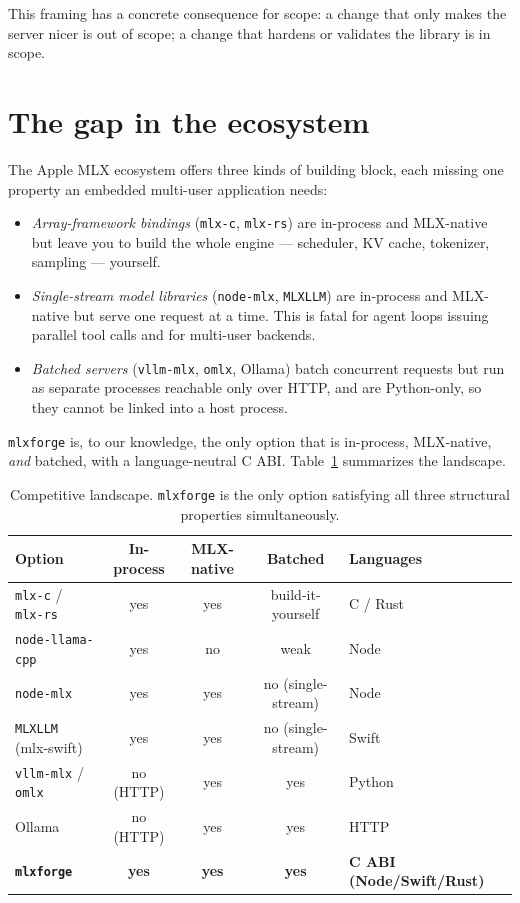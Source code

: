 \documentclass[11pt,a4paper]{report}
\newcommand{\code}[1]{\texttt{#1}}
\begin{document}
This framing has a concrete consequence for scope: a change that only makes the
server nicer is out of scope; a change that hardens or validates the library is in
scope.

\section{The gap in the ecosystem}
The Apple MLX ecosystem offers three kinds of building block, each missing one
property an embedded multi-user application needs:

\begin{itemize}[nosep]
  \item \emph{Array-framework bindings} (\code{mlx-c}, \code{mlx-rs}) are
        in-process and MLX-native but leave you to build the whole engine
        --- scheduler, KV cache, tokenizer, sampling --- yourself.
  \item \emph{Single-stream model libraries} (\code{node-mlx},
        \code{MLXLLM}) are in-process and MLX-native but serve one request at a
        time. This is fatal for agent loops issuing parallel tool calls and for
        multi-user backends.
  \item \emph{Batched servers} (\code{vllm-mlx}, \code{omlx}, Ollama) batch
        concurrent requests but run as separate processes reachable only over
        HTTP, and are Python-only, so they cannot be linked into a host process.
\end{itemize}

\code{mlxforge} is, to our knowledge, the only option that is in-process,
MLX-native, \emph{and} batched, with a language-neutral C ABI.
Table~\ref{tab:landscape} summarizes the landscape.

\begin{table}[t]
\centering
\caption{Competitive landscape. \code{mlxforge} is the only option satisfying all
three structural properties simultaneously.}
\label{tab:landscape}
\small
\begin{tabular}{@{}lccc l@{}}
\toprule
Option & In-process & MLX-native & Batched & Languages \\
\midrule
\code{mlx-c} / \code{mlx-rs}   & yes & yes & build-it-yourself & C / Rust \\
\code{node-llama-cpp}          & yes & no  & weak              & Node \\
\code{node-mlx}                & yes & yes & no (single-stream)& Node \\
\code{MLXLLM} (mlx-swift)      & yes & yes & no (single-stream)& Swift \\
\code{vllm-mlx} / \code{omlx}  & no (HTTP) & yes & yes          & Python \\
Ollama                         & no (HTTP) & yes & yes          & HTTP \\
\textbf{\code{mlxforge}}       & \textbf{yes} & \textbf{yes} & \textbf{yes} & \textbf{C ABI (Node/Swift/Rust)} \\
\bottomrule
\end{tabular}
\end{table}
\end{document}
